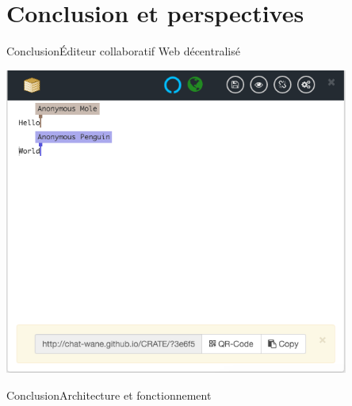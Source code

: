 \section{Conclusion et perspectives}

\begin{frame}{Conclusion}{Éditeur collaboratif Web décentralisé}
  
  \begin{center}
    \includegraphics[width=0.85\textwidth]{img/cratescreenshot.png}
  \end{center}

\end{frame}


\begin{frame}{Conclusion}{Architecture et fonctionnement}
  \hspace{-1cm}
  \begin{minipage}{0.47\textwidth}
    \begin{center}
      
    \end{center}
  \end{minipage}
  \hspace{0.5cm}
  \begin{minipage}{0.47\textwidth}
    \begin{center}
      
    \end{center}
  \end{minipage}
\end{frame}



